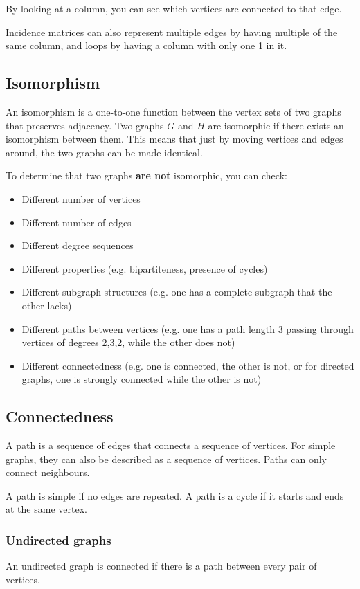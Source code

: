 By looking at a column, you can see which vertices are connected to that edge.

Incidence matrices can also represent multiple edges by having multiple of the same column, and loops by having a column with only one 1 in it.

\subsection{Isomorphism}
An isomorphism is a one-to-one function between the vertex sets of two graphs that preserves adjacency.
Two graphs $G$ and $H$ are isomorphic if there exists an isomorphism between them. This means that just by moving vertices and edges around, the two graphs can be made identical.

To determine that two graphs \textbf{are not} isomorphic, you can check:
\begin{itemize}
    \item Different number of vertices
    \item Different number of edges
    \item Different degree sequences
    \item Different properties (e.g. bipartiteness, presence of cycles)
    \item Different subgraph structures (e.g. one has a complete subgraph that the other lacks)
    \item Different paths between vertices (e.g. one has a path length 3 passing through vertices of degrees 2,3,2, while the other does not)
    \item Different connectedness (e.g. one is connected, the other is not, or for directed graphs, one is strongly connected while the other is not)
\end{itemize}

\subsection{Connectedness}
A path is a sequence of edges that connects a sequence of vertices. For simple graphs, they can also be described as a sequence of vertices. Paths can only connect neighbours.

A path is simple if no edges are repeated.
A path is a cycle if it starts and ends at the same vertex.

\subsubsection{Undirected graphs}
An undirected graph is connected if there is a path between every pair of vertices.

